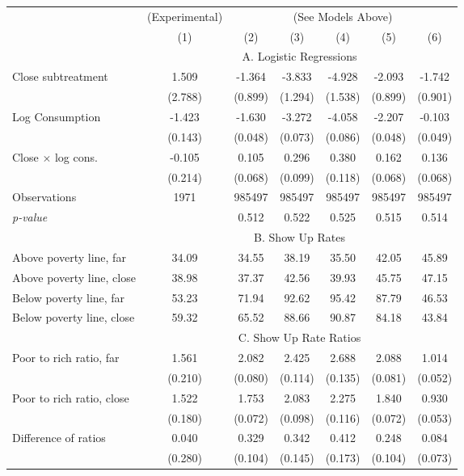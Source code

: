 \begin{tabular}{lcccccc}\toprule& (Experimental) & \multicolumn{5}{c}{(See Models Above)} \\ \cmidrule(lr){3-7} 
 & (1) & (2) & (3) & (4) & (5) & (6)\\\midrule
 & \multicolumn{6}{c}{\centering A. Logistic Regressions}\\\cmidrule(lr){2-7} 
Close subtreatment & 1.509 & -1.364 & -3.833 & -4.928 & -2.093 & -1.742 \\ & (2.788) & (0.899) & (1.294) & (1.538) & (0.899) & (0.901) \\Log Consumption & -1.423 & -1.630 & -3.272 & -4.058 & -2.207 & -0.103 \\ & (0.143) & (0.048) & (0.073) & (0.086) & (0.048) & (0.049) \\Close $\times$ log cons. & -0.105 & 0.105 & 0.296 & 0.380 & 0.162 & 0.136 \\ & (0.214) & (0.068) & (0.099) & (0.118) & (0.068) & (0.068) \\Observations & 1971 & 985497& 985497& 985497& 985497& 985497\\\textit{p-value} & & 0.512 & 0.522 & 0.525 & 0.515 & 0.514 \\\midrule
 & \multicolumn{6}{c}{\centering B. Show Up Rates}\\\cmidrule(lr){2-7} 
Above poverty line, far & 34.09 & 34.55 & 38.19 & 35.50 & 42.05 & 45.89 \\Above poverty line, close & 38.98 & 37.37 & 42.56 & 39.93 & 45.75 & 47.15 \\Below poverty line, far & 53.23 & 71.94 & 92.62 & 95.42 & 87.79 & 46.53 \\Below poverty line, close & 59.32 & 65.52 & 88.66 & 90.87 & 84.18 & 43.84 \\\midrule
 & \multicolumn{6}{c}{\centering C. Show Up Rate Ratios}\\\cmidrule(lr){2-7} 
Poor to rich ratio, far & 1.561 & 2.082 & 2.425 & 2.688 & 2.088 & 1.014 \\ & (0.210) & (0.080) & (0.114) & (0.135) & (0.081) & (0.052) \\Poor to rich ratio, close & 1.522 & 1.753 & 2.083 & 2.275 & 1.840 & 0.930 \\ & (0.180) & (0.072) & (0.098) & (0.116) & (0.072) & (0.053) \\Difference of ratios & 0.040 & 0.329 & 0.342 & 0.412 & 0.248 & 0.084 \\ & (0.280) & (0.104) & (0.145) & (0.173) & (0.104) & (0.073) \\\bottomrule\end{tabular}